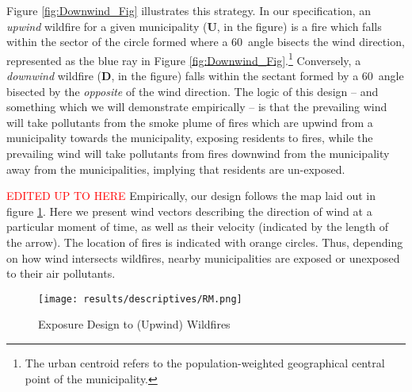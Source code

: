 \documentclass[11pt]{article}
\begin{document}
\begin{spacing}{1.3}
Figure \ref{fig:Downwind_Fig} illustrates this strategy. In our specification, an \textit{upwind} wildfire for a given municipality (\textbf{U}, in the figure) is a fire which falls within the sector of the circle formed where a 60\textdegree\  angle bisects the wind direction, represented as the blue ray in Figure \ref{fig:Downwind_Fig}.\footnote{The urban centroid refers to the population-weighted geographical central point of the municipality.} %
Conversely, a \textit{downwind} wildfire (\textbf{D}, in the figure) falls within the sectant formed by a 60\textdegree\ angle bisected by the \emph{opposite} of the wind direction.  The logic of this design -- and something which we will demonstrate empirically -- is that the prevailing wind will take pollutants from the smoke plume of fires which are upwind from a municipality towards the municipality, exposing residents to fires, while the prevailing wind will take pollutants from fires downwind from the municipality away from the municipalities, implying that residents are un-exposed.

\textcolor{red}{EDITED UP TO HERE}
Empirically, our design follows the map laid out in figure \ref{fig:design2}.  Here we present wind vectors describing the direction of wind at a particular moment of time, as well as their velocity (indicated by the length of the arrow).  The location of fires is indicated with orange circles. Thus, depending on how wind intersects wildfires, nearby municipalities are exposed or unexposed to their air pollutants.  

\begin{figure}
    \centering
    \texttt{[image: results/descriptives/RM.png]}
    \caption{Exposure Design to (Upwind) Wildfires}
    \label{fig:design2}
\end{figure}    




\end{spacing}
\end{document}
